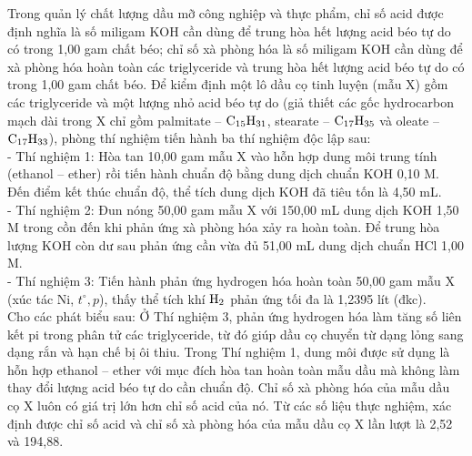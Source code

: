 \documentclass[11pt,a4paper]{article}
\begin{document}
\begin{ex}
Trong quản lý chất lượng dầu mỡ công nghiệp và thực phẩm, chỉ số acid được định nghĩa là số miligam KOH cần dùng để trung hòa hết lượng acid béo tự do có trong 1,00 gam chất béo; chỉ số xà phòng hóa là số miligam KOH cần dùng để xà phòng hóa hoàn toàn các triglyceride và trung hòa hết lượng acid béo tự do có trong 1,00 gam chất béo. Để kiểm định một lô dầu cọ tinh luyện (mẫu X) gồm các triglyceride và một lượng nhỏ acid béo tự do (giả thiết các gốc hydrocarbon mạch dài trong X chỉ gồm palmitate – $\ce{C15H31}$, stearate – $\ce{C17H35}$ và oleate – $\ce{C17H33}$), phòng thí nghiệm tiến hành ba thí nghiệm độc lập sau:\\
- Thí nghiệm 1: Hòa tan 10,00 gam mẫu X vào hỗn hợp dung môi trung tính (ethanol – ether) rồi tiến hành chuẩn độ bằng dung dịch chuẩn KOH 0,10 M. Đến điểm kết thúc chuẩn độ, thể tích dung dịch KOH đã tiêu tốn là 4,50 mL.\\
- Thí nghiệm 2: Đun nóng 50,00 gam mẫu X với 150,00 mL dung dịch KOH 1,50 M trong cồn đến khi phản ứng xà phòng hóa xảy ra hoàn toàn. Để trung hòa lượng KOH còn dư sau phản ứng cần vừa đủ 51,00 mL dung dịch chuẩn HCl 1,00 M.\\
- Thí nghiệm 3: Tiến hành phản ứng hydrogen hóa hoàn toàn 50,00 gam mẫu X (xúc tác Ni, $t^\circ, p$), thấy thể tích khí $\ce{H2}$ phản ứng tối đa là 1,2395 lít (đkc).\\
Cho các phát biểu sau:
\choiceTF
{Ở Thí nghiệm 3, phản ứng hydrogen hóa làm tăng số liên kết pi trong phân tử các triglyceride, từ đó giúp dầu cọ chuyển từ dạng lỏng sang dạng rắn và hạn chế bị ôi thiu.}
{\True Trong Thí nghiệm 1, dung môi được sử dụng là hỗn hợp ethanol – ether với mục đích hòa tan hoàn toàn mẫu dầu mà không làm thay đổi lượng acid béo tự do cần chuẩn độ.}
{\True Chỉ số xà phòng hóa của mẫu dầu cọ X luôn có giá trị lớn hơn chỉ số acid của nó.}
{\True Từ các số liệu thực nghiệm, xác định được chỉ số acid và chỉ số xà phòng hóa của mẫu dầu cọ X lần lượt là 2,52 và 194,88.}
\end{ex}
\end{document}
